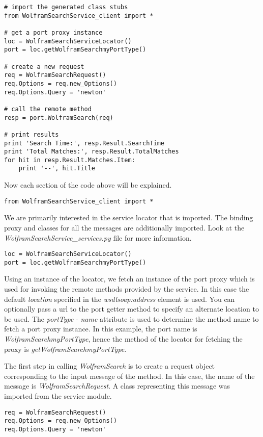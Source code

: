 \begin{verbatim}
# import the generated class stubs
from WolframSearchService_client import *

# get a port proxy instance
loc = WolframSearchServiceLocator()
port = loc.getWolframSearchmyPortType()

# create a new request
req = WolframSearchRequest()
req.Options = req.new_Options()
req.Options.Query = 'newton'

# call the remote method
resp = port.WolframSearch(req)

# print results
print 'Search Time:', resp.Result.SearchTime
print 'Total Matches:', resp.Result.TotalMatches
for hit in resp.Result.Matches.Item:
    print '--', hit.Title
\end{verbatim}

Now each section of the code above will be explained.

\begin{verbatim}
from WolframSearchService_client import *
\end{verbatim}

We are primarily interested in the service locator that is imported.  The
binding proxy and classes for all the messages are additionally imported.
Look at the {\it WolframSearchService_services.py} file for more information.

\begin{verbatim}
loc = WolframSearchServiceLocator()
port = loc.getWolframSearchmyPortType()
\end{verbatim}

Using an instance of the locator, we fetch an instance of the port proxy
which is used for invoking the remote methods provided by the service.  In
this case the default {\it location} specified in the {\it wsdlsoap:address}
element is used.  You can optionally pass a url to the port getter method to
specify an alternate location to be used.  The {\it portType} - {\it name}
attribute is used to determine the method name to fetch a port proxy instance.
In this example, the port name is {\it WolframSearchmyPortType}, hence the
method of the locator for fetching the proxy is {\it getWolframSearchmyPortType}.

The first step in calling {\it WolframSearch} is to create a request object
corresponding to the input message of the method.  In this case, the name of
the message is {\it WolframSearchRequest}.  A class representing this message
was imported from the service module.

\begin{verbatim}
req = WolframSearchRequest()
req.Options = req.new_Options()
req.Options.Query = 'newton'
\end{verbatim}

